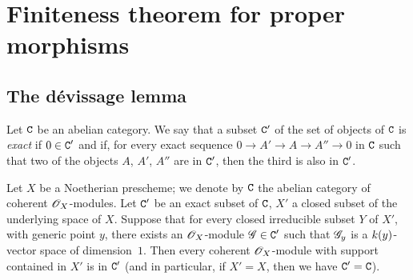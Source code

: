 \section{Finiteness theorem for proper morphisms}
\label{section:finiteness-theorem-for-proper-morphisms}

\subsection{The d\'evissage lemma}
\label{subsection:devissage-lemma}

\begin{defn}[3.1.1]
\label{3.3.1.1}
Let $\mathtt{C}$ be an abelian category.
We say that a subset $\mathtt{C}'$ of the set of objects of $\mathtt{C}$ is \emph{exact} if $0\in\mathtt{C}'$ and if, for every exact sequence $0\to A'\to A\to A''\to 0$ in $\mathtt{C}$ such that two of the objects $A$, $A'$, $A''$ are in $\mathtt{C}'$, then the third is also in $\mathtt{C}'$.
\end{defn}

\begin{thm}[3.1.2]
\label{3.3.1.2}
Let $X$ be a Noetherian prescheme; we denote by $\mathtt{C}$ the abelian category of coherent $\mathscr{O}_X$-modules.
Let $\mathtt{C}'$ be an exact subset of $\mathtt{C}$, $X'$ a closed subset of the underlying space of $X$.
Suppose that for every closed irreducible subset $Y$ of $X'$, with generic point $y$, there exists an $\mathscr{O}_X$-module $\mathscr{G}\in\mathtt{C}'$ such that $\mathscr{G}_y$ is a $k(y)$-vector space of dimension~$1$.
Then every coherent $\mathscr{O}_X$-module with support contained in $X'$ is in $\mathtt{C}'$ (and in particular, if $X'=X$, then we have $\mathtt{C}'=\mathtt{C}$).
\end{thm}

